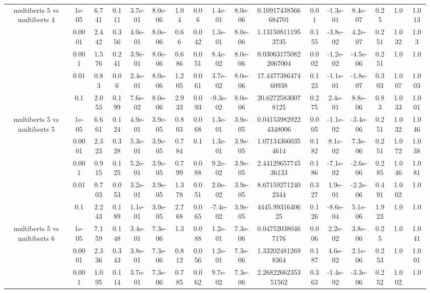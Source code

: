 \begin{tabular}{|c|c|c|c|c|c|c|c|c|c|c|c|c|c|c|c|c|}
\hline
\multirow{5}{*}{multiberts 5 vs multiberts 4} & 1e-05 & 6.741 & 0.111 & 3.7e-01 & 8.0e-06 & 1.04 & 0.06 & 1.4e-01 & 8.0e-06 & 0.10917438566684701 & 0.01 & -1.3e-01 & 8.4e-07 & 0.25 & 1.0 & 1.013 \\
 & 0.0001 & 2.442 & 0.356 & 4.0e-01 & 8.0e-06 & 0.66 & 0.042 & 1.3e-01 & 8.0e-06 & 1.131508111953735 & 0.155 & -3.8e-02 & 4.2e-07 & 0.251 & 1.032 & 1.03 \\
 & 0.001 & 1.576 & 0.241 & 3.9e-01 & 8.0e-06 & 0.686 & 0.051 & 8.4e-02 & 8.0e-06 & 0.030631750822067004 & 0.002 & -1.2e-02 & -4.5e-06 & 0.251 & 1.0 & 1.0 \\
 & 0.01 & 0.83 & 0.06 & 2.4e-01 & 8.0e-06 & 1.205 & 0.061 & 3.7e-02 & 8.0e-06 & 17.447738647460938 & 0.123 & -1.1e-01 & -1.8e-07 & 0.303 & 1.007 & 1.003 \\
 & 0.1 & 2.053 & 0.199 & 7.6e-02 & 8.0e-06 & 2.933 & 0.093 & -9.3e-02 & 8.0e-06 & 20.62725830078125 & 0.275 & 2.4e-01 & 8.8e-06 & 0.83 & 1.033 & 1.001 \\
\hline
\multirow{5}{*}{multiberts 5 vs multiberts 5} & 1e-05 & 6.661 & 0.124 & 4.9e-01 & 3.9e-05 & 0.803 & 0.068 & 1.3e-01 & 3.9e-05 & 0.041539829224348006 & 0.005 & -1.1e-02 & -3.4e-06 & 0.251 & 1.032 & 1.046 \\
 & 0.0001 & 2.323 & 0.328 & 5.3e-01 & 3.9e-05 & 0.784 & 0.1 & 1.3e-01 & 3.9e-05 & 1.071343660354614 & 0.182 & 8.1e-02 & 7.3e-06 & 0.251 & 1.072 & 1.038 \\
 & 0.001 & 0.915 & 0.125 & 5.2e-01 & 3.9e-05 & 0.799 & 0.088 & 9.2e-02 & 3.9e-05 & 2.4412965774536133 & 0.186 & -7.1e-02 & -2.6e-06 & 0.285 & 1.046 & 1.081 \\
 & 0.01 & 0.703 & 0.053 & 3.2e-01 & 3.9e-05 & 1.378 & 0.051 & 2.0e-02 & 3.9e-05 & 8.671592712402344 & 0.327 & 1.9e-01 & -2.2e-06 & 0.491 & 1.002 & 1.0 \\
 & 0.1 & 2.243 & 0.189 & 1.1e-01 & 3.9e-05 & 2.768 & 0.065 & -7.4e-02 & 3.9e-05 & 4445.9931640625 & 0.126 & -8.6e-04 & 5.1e-06 & 1.923 & 1.0 & 1.0 \\
\hline
\multirow{5}{*}{multiberts 5 vs multiberts 6} & 1e-05 & 7.159 & 0.148 & 3.4e-01 & 7.3e-06 & 1.3 & 0.088 & 1.2e-01 & 7.3e-06 & 0.047520380467176 & 0.006 & 2.2e-02 & 3.8e-06 & 0.25 & 1.0 & 1.041 \\
 & 0.0001 & 2.336 & 0.343 & 3.8e-01 & 7.3e-06 & 0.812 & 0.056 & 1.2e-01 & 7.3e-06 & 1.332024812698364 & 0.187 & 4.6e-02 & 2.1e-06 & 0.253 & 1.0 & 1.001 \\
 & 0.001 & 1.095 & 0.114 & 3.7e-01 & 7.3e-06 & 0.785 & 0.062 & 9.7e-02 & 7.3e-06 & 2.2682266235351562 & 0.363 & -1.4e-02 & -3.3e-06 & 0.252 & 1.002 & 1.0 \\

\end{tabular}
